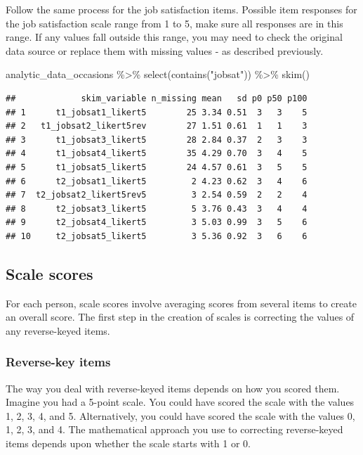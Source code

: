 \documentclass[
]{krantz}
\makeatletter
\newenvironment{Shaded}{\begin{snugshade}}{\end{snugshade}}
\newcommand{\FunctionTok}[1]{\textcolor[rgb]{0,0,0}{#1}}
\newcommand{\NormalTok}[1]{#1}
\newcommand{\SpecialCharTok}[1]{\textcolor[rgb]{0,0,0}{#1}}
\newcommand{\StringTok}[1]{\textcolor[rgb]{0.5,0.5,0.5}{#1}}
\newenvironment{kframe}{%
\medskip{}
\setlength{\fboxsep}{.8em}
 \def\at@end@of@kframe{}%
 \ifinner\ifhmode%
  \def\at@end@of@kframe{\end{minipage}}%
  \begin{minipage}{\columnwidth}%
 \fi\fi%
 \def\FrameCommand##1{\hskip\@totalleftmargin \hskip-\fboxsep
 \colorbox{shadecolor}{##1}\hskip-\fboxsep
     \hskip-\linewidth \hskip-\@totalleftmargin \hskip\columnwidth}%
 \MakeFramed {\advance\hsize-\width
   \@totalleftmargin\z@ \linewidth\hsize
   \@setminipage}}%
 {\par\unskip\endMakeFramed%
 \at@end@of@kframe}
\renewenvironment{Shaded}{\begin{kframe}}{\end{kframe}}
\makeatother
\begin{document}
Follow the same process for the job satisfaction items. Possible item responses for the job satisfaction scale range from 1 to 5, make sure all responses are in this range. If any values fall outside this range, you may need to check the original data source or replace them with missing values - as described previously.

\begin{Shaded}
\begin{Highlighting}[]
\NormalTok{analytic\_data\_occasions }\SpecialCharTok{\%\textgreater{}\%}
  \FunctionTok{select}\NormalTok{(}\FunctionTok{contains}\NormalTok{(}\StringTok{"jobsat"}\NormalTok{)) }\SpecialCharTok{\%\textgreater{}\%}
  \FunctionTok{skim}\NormalTok{()}
\end{Highlighting}
\end{Shaded}

\begin{verbatim}
##             skim_variable n_missing mean   sd p0 p50 p100
## 1      t1_jobsat1_likert5        25 3.34 0.51  3   3    5
## 2   t1_jobsat2_likert5rev        27 1.51 0.61  1   1    3
## 3      t1_jobsat3_likert5        28 2.84 0.37  2   3    3
## 4      t1_jobsat4_likert5        35 4.29 0.70  3   4    5
## 5      t1_jobsat5_likert5        24 4.57 0.61  3   5    5
## 6      t2_jobsat1_likert5         2 4.23 0.62  3   4    6
## 7  t2_jobsat2_likert5rev5         3 2.54 0.59  2   2    4
## 8      t2_jobsat3_likert5         5 3.76 0.43  3   4    4
## 9      t2_jobsat4_likert5         3 5.03 0.99  3   5    6
## 10     t2_jobsat5_likert5         3 5.36 0.92  3   6    6
\end{verbatim}

\hypertarget{scale-scores-1}{%
\subsection{Scale scores}\label{scale-scores-1}}

For each person, scale scores involve averaging scores from several items to create an overall score. The first step in the creation of scales is correcting the values of any reverse-keyed items.

\hypertarget{reverse-key-items-1}{%
\subsubsection{Reverse-key items}\label{reverse-key-items-1}}

The way you deal with reverse-keyed items depends on how you scored them. Imagine you had a 5-point scale. You could have scored the scale with the values 1, 2, 3, 4, and 5. Alternatively, you could have scored the scale with the values 0, 1, 2, 3, and 4. The mathematical approach you use to correcting reverse-keyed items depends upon whether the scale starts with 1 or 0.
\end{document}
